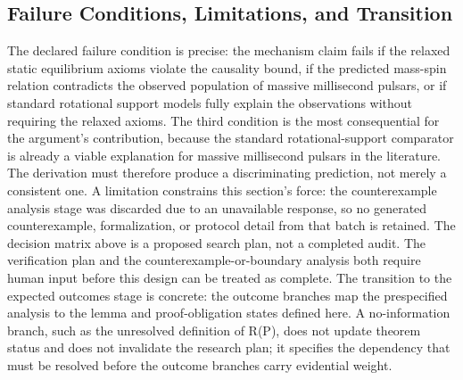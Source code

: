 \documentclass[conference]{IEEEtran}
\begin{document}
\subsection{Failure Conditions, Limitations, and Transition}
The declared failure condition is precise: the mechanism claim fails if the relaxed static equilibrium axioms violate the causality bound, if the predicted mass-spin relation contradicts the observed population of massive millisecond pulsars, or if standard rotational support models fully explain the observations without requiring the relaxed axioms. The third condition is the most consequential for the argument's contribution, because the standard rotational-support comparator is already a viable explanation for massive millisecond pulsars in the literature. The derivation must therefore produce a discriminating prediction, not merely a consistent one. A limitation constrains this section's force: the counterexample analysis stage was discarded due to an unavailable response, so no generated counterexample, formalization, or protocol detail from that batch is retained. The decision matrix above is a proposed search plan, not a completed audit. The verification plan and the counterexample-or-boundary analysis both require human input before this design can be treated as complete. The transition to the expected outcomes stage is concrete: the outcome branches map the prespecified analysis to the lemma and proof-obligation states defined here. A no-information branch, such as the unresolved definition of R(P), does not update theorem status and does not invalidate the research plan; it specifies the dependency that must be resolved before the outcome branches carry evidential weight.
\end{document}
